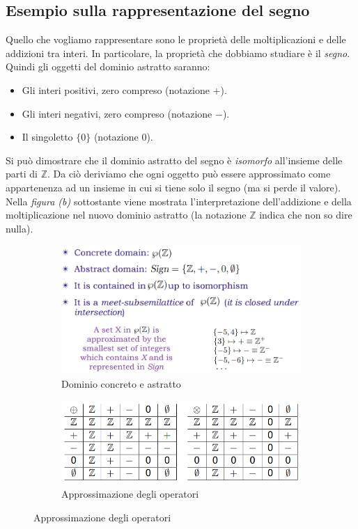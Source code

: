 \documentclass[a4paper,oneside,titlepage]{book}
\begin{document}
\subsection{Esempio sulla rappresentazione del segno}
Quello che vogliamo rappresentare sono le proprietà delle moltiplicazioni e delle addizioni tra interi. In particolare, la proprietà che dobbiamo studiare è il \textit{segno}. Quindi gli oggetti del dominio astratto saranno:
\begin{itemize}
    \item Gli interi positivi, zero compreso (notazione $+$).
    \item Gli interi negativi, zero compreso (notazione $-$).
    \item Il singoletto $\{ 0 \}$ (notazione $0$).
\end{itemize}
Si può dimostrare che il dominio astratto del segno è \textit{isomorfo} all'insieme delle parti di $\mathbb{Z}$. Da ciò deriviamo che ogni oggetto può essere approssimato come appartenenza ad un insieme in cui si tiene solo il segno (ma si perde il valore). Nella \textit{figura (b)} sottostante viene mostrata l'interpretazione dell'addizione e della moltiplicazione nel nuovo dominio astratto (la notazione $\mathbb{Z}$ indica che non so dire nulla).
\begin{figure}[htp]
	\begin{subfigure}{0.49\textwidth}
	    \centering
		\includegraphics[width=\textwidth, height=\textheight, keepaspectratio]{sign1.png}
		\caption{Dominio concreto e astratto}
	\end{subfigure}
	\hfill
	\begin{subfigure}{0.49\textwidth}
	    \centering
		\includegraphics[width=\textwidth, height=\textheight, keepaspectratio]{sign2.png} 
		\caption{Approssimazione degli operatori}
	\end{subfigure}
\end{figure}
\end{document}
